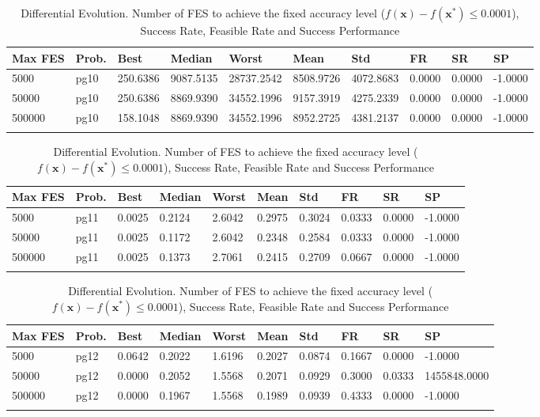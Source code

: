 \documentclass[10pt, a4paper]{book}
\begin{document}
\begin{center}
\begin{longtable}{l l l l l l l l l l}
\textbf{Max FES} & \textbf{Prob.} & \textbf{Best} & \textbf{Median} & \textbf{Worst} & \textbf{Mean} & \textbf{Std} & \textbf{FR} & \textbf{SR} & \textbf{SP} \\
\hline
5000 & pg10 & 250.6386 & 9087.5135 & 28737.2542 & 8508.9726 & 4072.8683 & 0.0000 & 0.0000 & -1.0000 \\
50000 & pg10 & 250.6386 & 8869.9390 & 34552.1996 & 9157.3919 & 4275.2339 & 0.0000 & 0.0000 & -1.0000 \\
500000 & pg10 & 158.1048 & 8869.9390 & 34552.1996 & 8952.2725 & 4381.2137 & 0.0000 & 0.0000 & -1.0000 \\

\caption{ Differential Evolution. Number of FES to achieve the fixed accuracy level ($f(\mathbf{x}) - f(\mathbf{x}^{*}) \leq 0.0001$), Success Rate, Feasible Rate and Success Performance }
\end{longtable}
\end{center}

\begin{center}
\begin{longtable}{l l l l l l l l l l}
\textbf{Max FES} & \textbf{Prob.} & \textbf{Best} & \textbf{Median} & \textbf{Worst} & \textbf{Mean} & \textbf{Std} & \textbf{FR} & \textbf{SR} & \textbf{SP} \\
\hline
5000 & pg11 & 0.0025 & 0.2124 & 2.6042 & 0.2975 & 0.3024 & 0.0333 & 0.0000 & -1.0000 \\
50000 & pg11 & 0.0025 & 0.1172 & 2.6042 & 0.2348 & 0.2584 & 0.0333 & 0.0000 & -1.0000 \\
500000 & pg11 & 0.0025 & 0.1373 & 2.7061 & 0.2415 & 0.2709 & 0.0667 & 0.0000 & -1.0000 \\

\caption{ Differential Evolution. Number of FES to achieve the fixed accuracy level ($f(\mathbf{x}) - f(\mathbf{x}^{*}) \leq 0.0001$), Success Rate, Feasible Rate and Success Performance }
\end{longtable}
\end{center}

\begin{center}
\begin{longtable}{l l l l l l l l l l}
\textbf{Max FES} & \textbf{Prob.} & \textbf{Best} & \textbf{Median} & \textbf{Worst} & \textbf{Mean} & \textbf{Std} & \textbf{FR} & \textbf{SR} & \textbf{SP} \\
\hline
5000 & pg12 & 0.0642 & 0.2022 & 1.6196 & 0.2027 & 0.0874 & 0.1667 & 0.0000 & -1.0000 \\
50000 & pg12 & 0.0000 & 0.2052 & 1.5568 & 0.2071 & 0.0929 & 0.3000 & 0.0333 & 1455848.0000 \\
500000 & pg12 & 0.0000 & 0.1967 & 1.5568 & 0.1989 & 0.0939 & 0.4333 & 0.0000 & -1.0000 \\

\caption{ Differential Evolution. Number of FES to achieve the fixed accuracy level ($f(\mathbf{x}) - f(\mathbf{x}^{*}) \leq 0.0001$), Success Rate, Feasible Rate and Success Performance }
\end{longtable}
\end{center}
\end{document}
